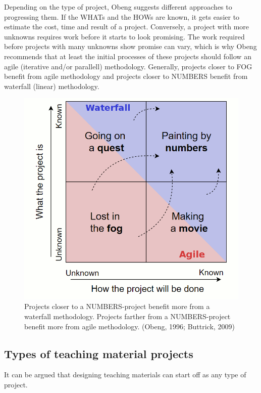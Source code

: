Depending on the type of project, Obeng suggests different approaches to progressing them. If the WHATs and the HOWs are known, it gets easier to estimate the cost, time and result of a project. Conversely, a project with more unknowns requires work before it starts to look promising. The work required before projects with many unknowns show promise can vary, which is why Obeng recommends that at least the initial processes of these projects should follow an agile (iterative and/or parallell) methodology. Generally, projects closer to FOG benefit from agile methodology and projects closer to NUMBERS benefit from waterfall (linear) methodology.

\begin{figure}[H]
\hspace*{-1cm}
\centering
\includegraphics[scale=0.35]{figure/obeng3.png}
\caption{Projects closer to a NUMBERS-project benefit more from a waterfall methodology. Projects farther from a NUMBERS-project benefit more from agile methodology. (Obeng, 1996; Buttrick, 2009)}
\label{obeng3}
\end{figure}


\subsection{Types of teaching material projects}
It can be argued that designing teaching materials can start off as any type of project. 

